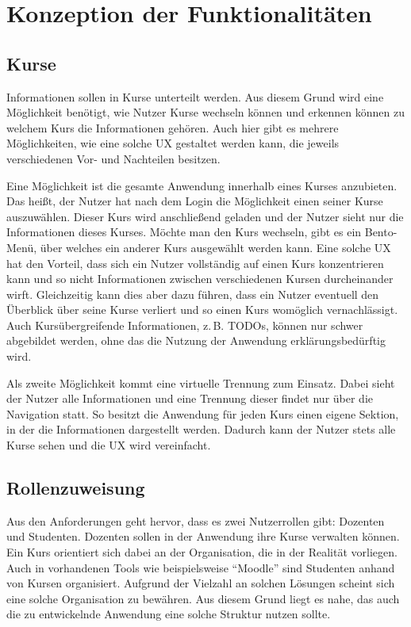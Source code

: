 \section{Konzeption der Funktionalitäten}\label{sec:konzeptionFunktionalitaeten}


\subsection{Kurse}\label{sub:konzeptionKurse}

Informationen sollen in Kurse unterteilt werden.
Aus diesem Grund wird eine Möglichkeit benötigt, wie Nutzer Kurse wechseln können und erkennen können zu welchem Kurs die Informationen gehören.
Auch hier gibt es mehrere Möglichkeiten, wie eine solche \ac{UX} gestaltet werden kann, die jeweils verschiedenen Vor- und Nachteilen besitzen.

Eine Möglichkeit ist die gesamte Anwendung innerhalb eines Kurses anzubieten.
Das heißt, der Nutzer hat nach dem Login die Möglichkeit einen seiner Kurse auszuwählen.
Dieser Kurs wird anschließend geladen und der Nutzer sieht nur die Informationen dieses Kurses.
Möchte man den Kurs wechseln, gibt es ein Bento-Menü, über welches ein anderer Kurs ausgewählt werden kann.
Eine solche \ac{UX} hat den Vorteil, dass sich ein Nutzer vollständig auf einen Kurs konzentrieren kann und so nicht Informationen zwischen verschiedenen Kursen durcheinander wirft.
Gleichzeitig kann dies aber dazu führen, dass ein Nutzer eventuell den Überblick über seine Kurse verliert und so einen Kurs womöglich vernachlässigt.
Auch Kursübergreifende Informationen, z.\,B. TODOs, können nur schwer abgebildet werden, ohne das die Nutzung der Anwendung erklärungsbedürftig wird.

Als zweite Möglichkeit kommt eine virtuelle Trennung zum Einsatz.
Dabei sieht der Nutzer alle Informationen und eine Trennung dieser findet nur über die Navigation statt.
So besitzt die Anwendung für jeden Kurs einen eigene Sektion, in der die Informationen dargestellt werden.
Dadurch kann der Nutzer stets alle Kurse sehen und die \ac{UX} wird vereinfacht.



\subsection{Rollenzuweisung}

Aus den Anforderungen geht hervor, dass es zwei Nutzerrollen gibt: Dozenten und Studenten.
Dozenten sollen in der Anwendung ihre Kurse verwalten können.
Ein Kurs orientiert sich dabei an der Organisation, die in der Realität vorliegen.
Auch in vorhandenen Tools wie beispielsweise \enquote{Moodle} sind Studenten anhand von Kursen organisiert.
Aufgrund der Vielzahl an solchen Lösungen scheint sich eine solche Organisation zu bewähren.
Aus diesem Grund liegt es nahe, das auch die zu entwickelnde Anwendung eine solche Struktur nutzen sollte.

